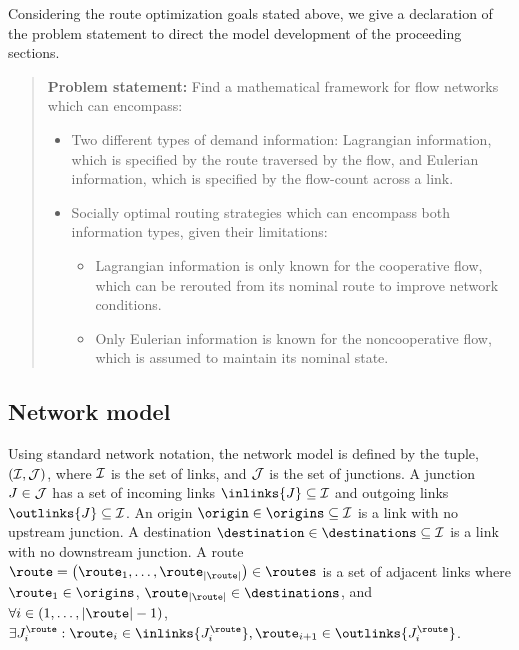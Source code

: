 Considering the route optimization goals stated above, we give a declaration
of the problem statement to direct the model development of the proceeding
sections.
\begin{verse}
\textbf{Problem statement: }Find a mathematical framework for flow
networks which can encompass:
\begin{itemize}
\item Two different types of demand information: Lagrangian information,
which is specified by the route traversed by the flow, and Eulerian
information, which is specified by the flow-count across a link.
\item Socially optimal routing strategies which can encompass both information
types, given their limitations:

\begin{itemize}
\item Lagrangian information is only known for the cooperative flow, which
can be rerouted from its nominal route to improve network conditions.
\item Only Eulerian information is known for the noncooperative flow, which
is assumed to maintain its nominal state.
\end{itemize}
\end{itemize}
\end{verse}

\subsection{Network model\label{sub:Network-Model}}

Using standard network notation, the network model is defined by the
tuple, $\left(\links,\junctions\right)$, where $\mathcal{I}$ is the set
of links, and $\mathcal{J}$ is the set of junctions. A junction $J\in\mathcal{J}$
has a set of incoming links $\inlinks{\junction}\subseteq\links$
and outgoing links $\outlinks{\junction}\subseteq\links$. An origin
$\origin\in\origins\subseteq\links$ is a link with no upstream junction.
A destination $\destination\in\destinations\subseteq\links$ is a
link with no downstream junction. A route $\route=\left(\route_{1},\ldots,\route_{\left|\route\right|}\right)\in\routes$
is a set of adjacent links where $\route_{1}\in\origins$, $\route_{\left|\route\right|}\in\destinations$,
and $\forall i\in\left(1,\ldots,\left|\route\right|-1\right)$, $\exists\junction_{i}^{\route}:\route_{i}\in\inlinks{\junction_{i}^{\route}},\route_{i+1}\in\outlinks{\junction_{i}^{\route}}$.


